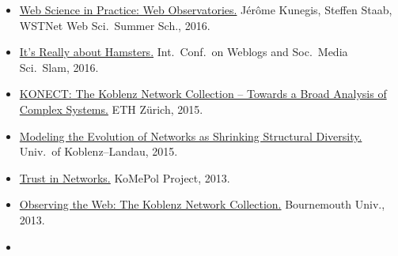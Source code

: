 \documentclass[line,mm]{res}
\newcounter{x}
\newcounter{y}
\newcommand{\talknumber}{T\arabic{y}\stepcounter{y}}
\begin{document}
\begin{resume}
\begin{itemize}
{    Project.}  Univ.\ of Namur, 2016. 
  \item[{[\talknumber]}] 
    \href{https://github.com/kunegis/pdfs/blob/master/kunegis:web-observatories.presentation.pdf}{Web Science in Practice:  Web Observatories.}  
    Jérôme Kunegis, Steffen Staab, WSTNet Web Sci.\ Summer Sch., 2016.  
  \item[{[\talknumber]}]
    \href{https://www.slideshare.net/kunegis/science-slam-by-jrme-kunegis-icwsm-2016}{It's Really about Hamsters.}
    Int.\ Conf.\ on Weblogs and Soc.\ Media Sci.\ Slam, 2016. 
  \item[{[\talknumber]}] 
    \href{https://github.com/kunegis/pdfs/blob/master/kunegis:konect-eth.presentation.pdf}{KONECT:
      The Koblenz Network Collection -- Towards a Broad Analysis of Complex Systems.}  ETH Zürich, 2015.
  \item[{[\talknumber]}] 
    \href{https://github.com/kunegis/pdfs/blob/master/kunegis:shrinking-diversity.presentation.pdf}{Modeling
      the Evolution of Networks as Shrinking 
      Structural Diversity.}  Univ.\ of Koblenz--Landau, 2015. 
  \item[{[\talknumber]}]
    \href{https://github.com/kunegis/pdfs/blob/master/kunegis:konect-komepol.presentation.pdf}{Trust in Networks.}
    KoMePol Project, 2013. 
  \item[{[\talknumber]}] 
    \href{https://github.com/kunegis/pdfs/blob/master/kunegis:konect-bournemouth.presentation.pdf}{Observing
      the Web: The Koblenz Network Collection.}  Bournemouth Univ., 2013.
  \item[{[\talknumber]}] 

\end{itemize}
\end{resume}
\end{document}
